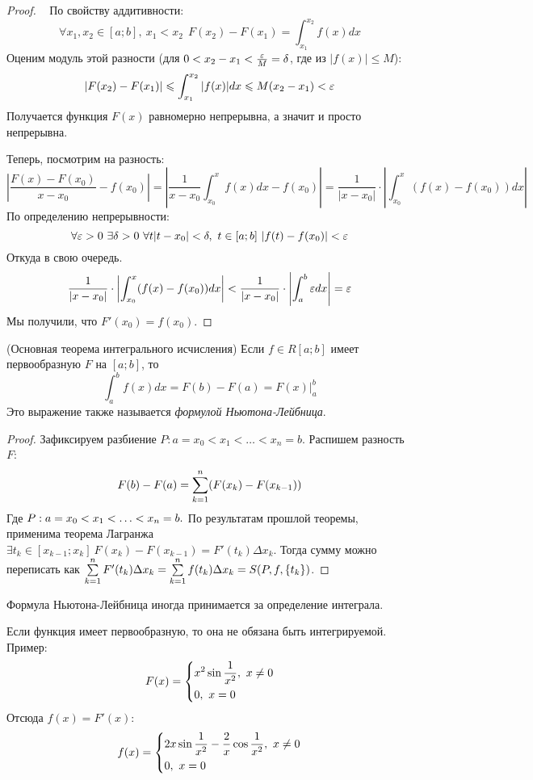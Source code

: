 \begin{proof}~
		По свойству аддитивности:
		\[
			\forall x_1, x_2 \in [a; b],\ x_1 < x_2\ \ F(x_2) - F(x_1) = \int_{x_1}^{x_2} f(x)dx
		\]
		Оценим модуль этой разности (для $0 < x_2 - x_1 < \frac{\varepsilon}{M} = \delta$, где из $|f(x)| \le M$):
		\[
			|F(x_2) - F(x_1)| \leqslant \int_{x_1}^{x_2} |f(x)|dx \leqslant M(x_2 - x_1) < \varepsilon
		\]
		Получается функция $F(x)$ равномерно непрерывна, а значит и просто непрерывна.
		
		Теперь, посмотрим на разность:
		\[
			\left|\frac{F(x) - F(x_0)}{x - x_0} - f(x_0)\right| = \left|\frac{1}{x - x_0} \int_{x_0}^x f(x)dx - f(x_0)\right| = \frac{1}{|x - x_0|} \cdot \left|\int_{x_0}^x (f(x) - f(x_0))dx\right|
		\]
		По определению непрерывности:
		\[
			\forall \varepsilon > 0\ \exists \delta > 0\ \forall t |t - x_0| < \delta ,\ t \in [a;b]\ |f(t) - f(x_0)| < \varepsilon
		\]
		Откуда в свою очередь.
		\[
			\frac{1}{|x - x_0|} \cdot \left|\int_{x_0}^x (f(x) - f(x_0))dx\right| < \frac{1}{|x - x_0|} \cdot \left|\int_a^b\varepsilon dx\right|  = \varepsilon
		\]
		Мы получили, что $F'(x_0) = f(x_0)$.
\end{proof}

\begin{theorem} (Основная теорема интегрального исчисления)
	Если $f \in R[a; b]$ имеет первообразную $F$ на $[a; b]$, то
	\[
		\int_a^b f(x)dx = F(b) - F(a) = F(x)\Big|_a^b
	\]
	Это выражение также называется \textit{формулой Ньютона-Лейбница}.
\end{theorem}

\begin{proof}
	Зафиксируем разбиение $P \colon a = x_0 < x_1 < \ldots < x_n = b$. Распишем разность $F$:
	\[
		F(b) - F(a) = \sum\limits_{k = 1}^n (F(x_k) - F(x_{k - 1}))
	\]
	Где $P: a = x_0 < x_1<\ldots< x_n = b.\\$
	По результатам прошлой теоремы, применима теорема Лагранжа $\exists t_k \in [x_{k - 1};x_k]\ F(x_k) - F(x_{k - 1}) = F'(t_k)\Delta x_k$. Тогда сумму можно переписать как $ \sum\limits_{k = 1}^nF'(t_k)\Delta x_k = \sum\limits_{k = 1}^nf(t_k)\Delta x_k = S(P, f, \{t_k\})$.
\end{proof}

\begin{note}
	Формула Ньютона-Лейбница иногда принимается за определение интеграла.
\end{note}

\begin{note}
	Если функция имеет первообразную, то она не обязана быть интегрируемой. Пример:
	\[
		F(x) = \left\{\begin{aligned}
			&{x^2 \sin \frac{1}{x^2},\ x \neq 0}
			\\
			&{0,\ x = 0}
		\end{aligned}\right.
	\]
	Отсюда $f(x) = F'(x)$:
	\[
		f(x) = \left\{\begin{aligned}
			&{2x \sin \frac{1}{x^2} - \frac{2}{x}\cos \frac{1}{x^2},\ x \neq 0}
			\\
			&{0,\ x = 0}
		\end{aligned}\right.
	\]
\end{note}